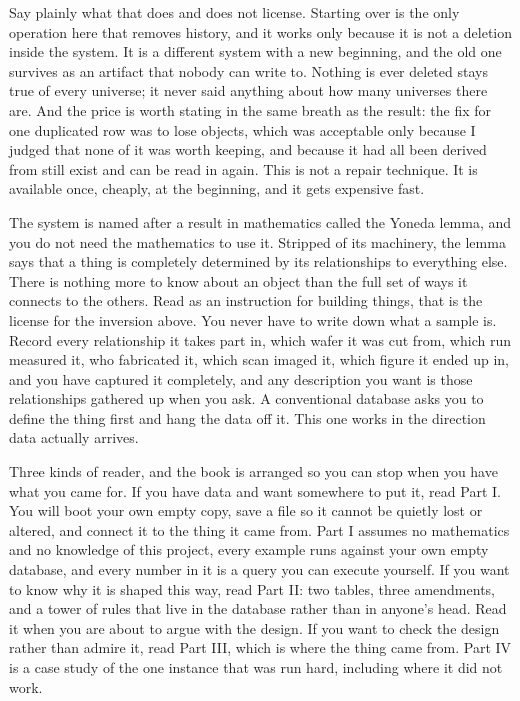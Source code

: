 Say plainly what that does and does not license. Starting over is the only operation here that removes history, and it works only because it is not a deletion inside the system. It is a different system with a new beginning, and the old one survives as an artifact that nobody can write to. Nothing is ever deleted stays true of every universe; it never said anything about how many universes there are. And the price is worth stating in the same breath as the result: the fix for one duplicated row was to lose \labLineageObjects{} objects, which was acceptable only because I judged that none of it was worth keeping, and because \labLineageSource{} it had all been derived from still exist and can be read in again. This is not a repair technique. It is available once, cheaply, at the beginning, and it gets expensive fast.

The system is named after a result in mathematics called the Yoneda lemma, and you do not need the mathematics to use it. Stripped of its machinery, the lemma says that a thing is completely determined by its relationships to everything else. There is nothing more to know about an object than the full set of ways it connects to the others. Read as an instruction for building things, that is the license for the inversion above. You never have to write down what a sample is. Record every relationship it takes part in, which wafer it was cut from, which run measured it, who fabricated it, which scan imaged it, which figure it ended up in, and you have captured it completely, and any description you want is those relationships gathered up when you ask. A conventional database asks you to define the thing first and hang the data off it. This one works in the direction data actually arrives.

Three kinds of reader, and the book is arranged so you can stop when you have what you came for. If you have data and want somewhere to put it, read Part I. You will boot your own empty copy, save a file so it cannot be quietly lost or altered, and connect it to the thing it came from. Part I assumes no mathematics and no knowledge of this project, every example runs against your own empty database, and every number in it is a query you can execute yourself. If you want to know why it is shaped this way, read Part II: two tables, three amendments, and a tower of rules that live in the database rather than in anyone's head. Read it when you are about to argue with the design. If you want to check the design rather than admire it, read Part III, which is where the thing came from. Part IV is a case study of the one instance that was run hard, including where it did not work.

